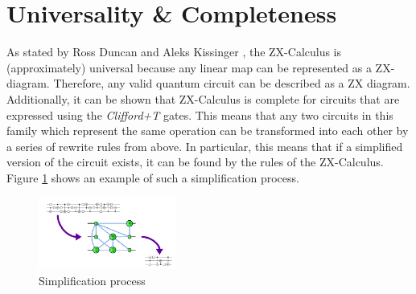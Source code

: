 \section{Universality \& Completeness}

As stated by Ross Duncan and Aleks Kissinger \cite{duncan2020simplification}, the ZX-Calculus is (approximately) universal because any linear map can be represented as a ZX-diagram. Therefore, any valid quantum circuit can be described as a ZX diagram. Additionally, it can be shown that ZX-Calculus is complete for circuits that are expressed using the \textit{Clifford+T} gates. This means that any two circuits in this family which represent the same operation can be transformed into each other by a series of rewrite rules from above.
In particular, this means that if a simplified version of the circuit exists, it can be found by the rules of the ZX-Calculus.
Figure \ref{fig:simplification-idea} shows an example of such a simplification process.

\begin{figure}[h!]
    \centering
    \includegraphics[width=0.4\textwidth]{images/simplification-idea.png}
    \caption{Simplification process\cite{duncan2020simplification-image}}
    \label{fig:simplification-idea}
\end{figure}